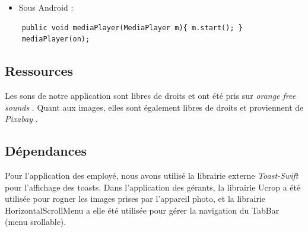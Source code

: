 \documentclass{article}
\begin{document}
\begin{itemize}
\item Sous Android : 
\end{itemize}
\begin{verbatim}
	public void mediaPlayer(MediaPlayer m){ m.start(); }
	mediaPlayer(on);
\end{verbatim}



\subsection{Ressources }
Les sons de notre application sont libres de droits et ont été pris sur \textit{orange free sounds } \cite{Orange}.
Quant aux images, elles sont également libres de droits et proviennent de \textit{Pixabay} \cite{Pixabay}.


\subsection{Dépendances}
Pour l'application des employé, nous avons utilisé la librairie externe \textit{Toast-Swift} \cite{Toast} pour l'affichage des toasts. 
Dans l'application des gérants, la librairie Ucrop\cite{uCrop}  a été utilisée pour rogner les images prises par l'appareil photo, et la librairie HorizontalScrollMenu\cite{HorizontalScrollMenu} a elle été utilisée pour gérer la navigation du TabBar (menu srollable).
\end{document}
